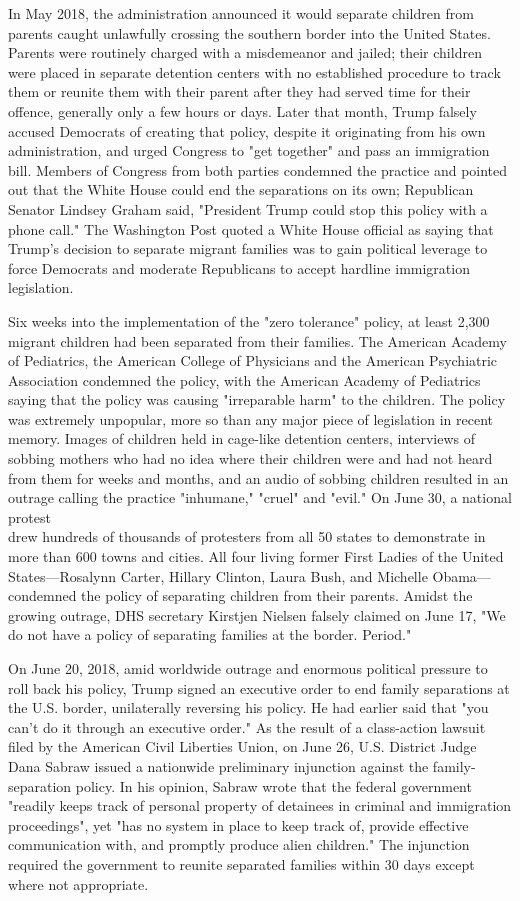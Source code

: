 In May 2018, the administration announced it would separate children
from parents caught unlawfully crossing the southern border into the
United States. Parents were routinely charged with a misdemeanor and
jailed; their children were placed in separate detention centers with no
established procedure to track them or reunite them with their parent
after they had served time for their offence, generally only a few hours
or days. Later that month, Trump falsely accused Democrats of creating
that policy, despite it originating from his own administration, and
urged Congress to "get together" and pass an immigration bill. Members
of Congress from both parties condemned the practice and pointed out
that the White House could end the separations on its own; Republican
Senator Lindsey Graham said, "President Trump could stop this policy
with a phone call." The Washington Post quoted a White House official as
saying that Trump's decision to separate migrant families was to gain
political leverage to force Democrats and moderate Republicans to accept
hardline immigration legislation.

Six weeks into the implementation of the "zero tolerance" policy, at
least 2,300 migrant children had been separated from their families. The
American Academy of Pediatrics, the American College of Physicians and
the American Psychiatric Association condemned the policy, with the
American Academy of Pediatrics saying that the policy was causing
"irreparable harm" to the children. The policy was extremely unpopular,
more so than any major piece of legislation in recent memory. Images of
children held in cage-like detention centers, interviews of sobbing
mothers who had no idea where their children were and had not heard from
them for weeks and months, and an audio of sobbing children resulted in
an outrage calling the practice "inhumane," "cruel" and "evil." On June
30, a national protest\\
drew hundreds of thousands of protesters from all 50 states to
demonstrate in more than 600 towns and cities. All four living former
First Ladies of the United States---Rosalynn Carter, Hillary Clinton,
Laura Bush, and Michelle Obama---condemned the policy of separating
children from their parents. Amidst the growing outrage, DHS secretary
Kirstjen Nielsen falsely claimed on June 17, "We do not have a policy of
separating families at the border. Period."

On June 20, 2018, amid worldwide outrage and enormous political pressure
to roll back his policy, Trump signed an executive order to end family
separations at the U.S. border, unilaterally reversing his policy. He
had earlier said that "you can't do it through an executive order." As
the result of a class-action lawsuit filed by the American Civil
Liberties Union, on June 26, U.S. District Judge Dana Sabraw issued a
nationwide preliminary injunction against the family-separation policy.
In his opinion, Sabraw wrote that the federal government "readily keeps
track of personal property of detainees in criminal and immigration
proceedings", yet "has no system in place to keep track of, provide
effective communication with, and promptly produce alien children." The
injunction required the government to reunite separated families within
30 days except where not appropriate.

